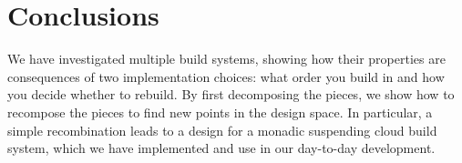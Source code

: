 \section{Conclusions}\label{sec-conclusions}

We have investigated multiple build systems, showing how their properties are consequences of two implementation choices: what order you build in and how you decide whether to rebuild. By first decomposing the pieces, we show how to recompose the pieces to find new points in the design space. In particular, a simple recombination leads to a design for a monadic suspending cloud build system, which we have implemented and use in our day-to-day development.
